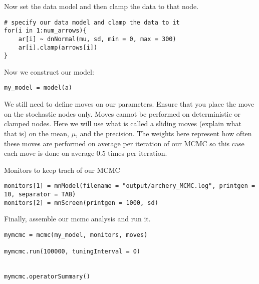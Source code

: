 Now set the data model and then clamp the data to that node.

{\tt \begin{snugshade*}
 \begin{lstlisting}
# specify our data model and clamp the data to it
for(i in 1:num_arrows){
	ar[i] ~ dnNormal(mu, sd, min = 0, max = 300)
	ar[i].clamp(arrows[i])
}
\end{lstlisting}
\end{snugshade*}}

Now we construct our model:

{\tt \begin{snugshade*}
 \begin{lstlisting}
my_model = model(a)
\end{lstlisting}
\end{snugshade*}}


We still need to define moves on our parameters. Ensure that you place the move on the stochastic nodes only. Moves cannot be performed on deterministic or clamped nodes. Here we will use what is called a sliding moves (explain what that is) on the mean, $\mu$, and the precision. The weights here represent how often these moves are performed on average per iteration of our MCMC so this case each move is done on average 0.5 times per iteration. 


Monitors to keep trach of our MCMC
{\tt \begin{snugshade*}
 \begin{lstlisting}
monitors[1] = mnModel(filename = "output/archery_MCMC.log", printgen = 10, separator = TAB)
monitors[2] = mnScreen(printgen = 1000, sd)

 \end{lstlisting}
\end{snugshade*}}

Finally, assemble our mcmc analysis and run it.

{\tt \begin{snugshade*}
 \begin{lstlisting}
mymcmc = mcmc(my_model, monitors, moves)

mymcmc.run(100000, tuningInterval = 0)


mymcmc.operatorSummary()
 \end{lstlisting}
\end{snugshade*}}



